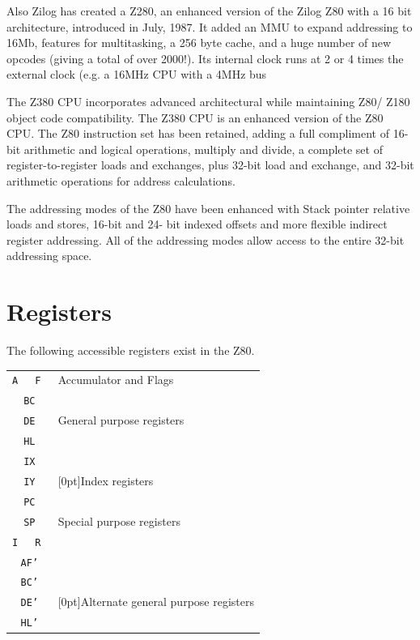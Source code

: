 \documentclass[oneside,a4paper]{book}
\begin{document}
Also Zilog has created a Z280, an enhanced version of the Zilog Z80 with a 16 bit
architecture, introduced in July, 1987. It added an MMU to expand addressing 
to 16Mb, features for multitasking, a 256 byte cache, and a huge number of 
new opcodes (giving a total of over 2000!). Its internal clock runs at 2 
or 4 times the external clock (e.g. a 16MHz CPU with a 4MHz bus

The Z380 CPU incorporates advanced architectural while maintaining Z80/
Z180 object code compatibility. The Z380 CPU is an enhanced version 
of the Z80 CPU. The Z80 instruction set has been retained, adding a full 
compliment of 16-bit arithmetic and logical operations, multiply
and divide, a complete set of register-to-register loads and exchanges, 
plus 32-bit load and exchange, and 32-bit arithmetic operations for 
address calculations.

The addressing modes of the Z80 have been enhanced
with Stack pointer relative loads and stores, 16-bit and 24-
bit indexed offsets and more flexible indirect register
addressing. All of the addressing modes allow access to
the entire 32-bit addressing space.

\section{Registers}

The following accessible registers exist in the Z80. \\[1ex]

\begin{tabular}{|c|c|l} \cline{1-2}
\tt A & \tt F & Accumulator and Flags \\ \cline{1-2} \cline{1-2}
\multicolumn{2}{|c|}{\tt BC} & \\ \cline{1-2}
\multicolumn{2}{|c|}{\tt DE} & General purpose registers \\ \cline{1-2}
\multicolumn{2}{|c|}{\tt HL} & \\ \cline{1-2}
\multicolumn{2}{|c|}{\tt IX} & \\ \cline{1-2}
\multicolumn{2}{|c|}{\tt IY} & \raisebox{1.5ex}[0pt]{Index registers} \\ \cline{1-2}
\multicolumn{2}{|c|}{\tt PC} & \\ \cline{1-2}
\multicolumn{2}{|c|}{\tt SP} & Special purpose registers \\ \cline{1-2}
\tt I & \tt R & \\ \cline{1-2}
\multicolumn{2}{|c|}{\tt AF'} & \\ \cline{1-2}
\multicolumn{2}{|c|}{\tt BC'} & \\ \cline{1-2}
\multicolumn{2}{|c|}{\tt DE'} & \raisebox{1.5ex}[0pt]{Alternate general purpose registers}\\ \cline{1-2}
\multicolumn{2}{|c|}{\tt HL'} & \\ \cline{1-2}
\end{tabular}
\\[1ex]
\end{document}
